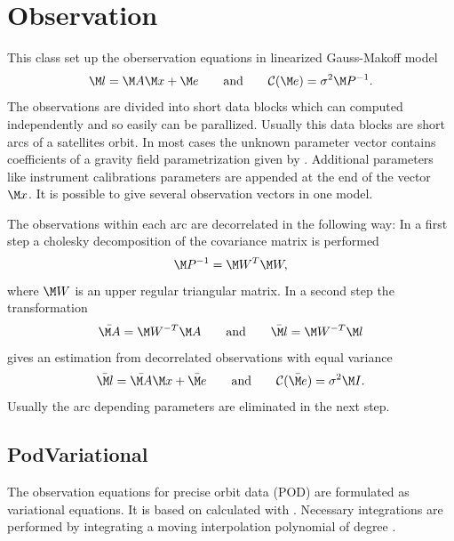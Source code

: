 \clearpage

\section{Observation}\label{observationType}
This class set up the oberservation equations in linearized Gauss-Makoff model
\begin{equation}\label{gmm}
\M l  = \M A \M x + \M e\qquad\text{and}\qquad\mathcal{C}(\M e) = \sigma^2\M P^{-1}.
\end{equation}
The observations are divided into short data blocks which can computed independently
and so easily can be parallized. Usually this data blocks are short arcs of a
satellites orbit. In most cases the unknown parameter vector contains coefficients
of a gravity field parametrization given by .
Additional parameters like instrument calibrations parameters are appended at the
end of the vector~$\M x$.
It is possible to give several observation vectors in one model.

The observations within each arc are decorrelated in the following way:
In a first step a cholesky decomposition of the covariance matrix is performed
\begin{equation}
\M P^{-1} = \M W^T\M W,
\end{equation}
where $\M W$ is an upper regular triangular matrix.
In a second step the transformation
\begin{equation}\label{dekorrelierung}
\bar{\M A} = \M W^{-T}\M A\qquad\text{and}\qquad \bar{\M l} = \M W^{-T}\M l
\end{equation}
gives an estimation from decorrelated observations with equal variance
\begin{equation}\label{normal.GMM}
\bar{\M l} = \bar{\M A} \M x + \bar{\M e}
\qquad\text{and}\qquad
\mathcal{C}(\bar{\M e})= \sigma^2 \M I.
\end{equation}
Usually the arc depending parameters are eliminated in the next step.


\subsection{PodVariational}\label{observationType:podVariational}
The observation equations for precise orbit data (POD) are formulated as variational equations.
It is based on  calculated with .
Necessary integrations are performed by integrating a moving interpolation polynomial of degree .

